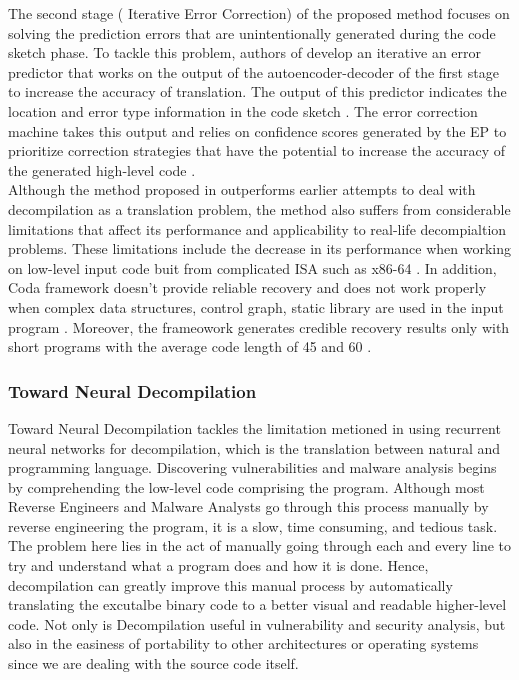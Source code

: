 \documentclass[conference,a4paper]{IEEEtran}
\begin{document}
The second stage ( Iterative Error Correction) of the proposed method focuses on solving the prediction errors that are unintentionally generated during the code sketch phase. To tackle this problem, authors of \cite{fu_neural-based_2019} develop an iterative an error predictor that works on the output of the autoencoder-decoder of the first stage to increase the accuracy of translation. The output of this predictor indicates the location and error type information in the code sketch \cite{fu_neural-based_2019}. The error correction machine takes this output and relies on confidence scores generated by the EP to prioritize correction strategies that have the potential to increase the accuracy of the generated high-level code \cite{fu_neural-based_2019}.\\

Although the method proposed in \cite{fu_neural-based_2019} outperforms earlier attempts to deal with decompilation as a translation problem, the method also suffers from considerable limitations that affect its performance and applicability to real-life decompialtion problems. These limitations include the decrease in its performance when working on low-level input code buit from complicated ISA such as x86-64 \cite{fu_neural-based_2019} . In addition, Coda framework doesn't provide reliable recovery and does not work properly when complex data structures, control graph, static library are used in the input program \cite{fu_neural-based_2019}. Moreover, the frameowork generates credible recovery results only with short programs with the average code length of 45 and 60 \cite{fu_neural-based_2019}. 

\subsubsection{Toward Neural Decompilation}

Toward Neural Decompilation tackles the limitation metioned in using recurrent neural networks for decompilation, which is the translation between natural and programming language. Discovering vulnerabilities and malware analysis begins by comprehending the low-level code comprising the program. Although most Reverse Engineers and Malware Analysts go through this process manually by reverse engineering
the program, it is a slow, time consuming, and tedious task. The problem here lies in the act of manually going through each and every line to try and understand what a program does and how it is done.
Hence, decompilation can greatly improve this manual process by automatically translating the excutalbe binary code to a better visual and readable higher-level code. Not only is Decompilation useful in vulnerability and security analysis, but also in the
easiness of portability to other architectures or operating systems since we are dealing with the source code itself.
\end{document}
